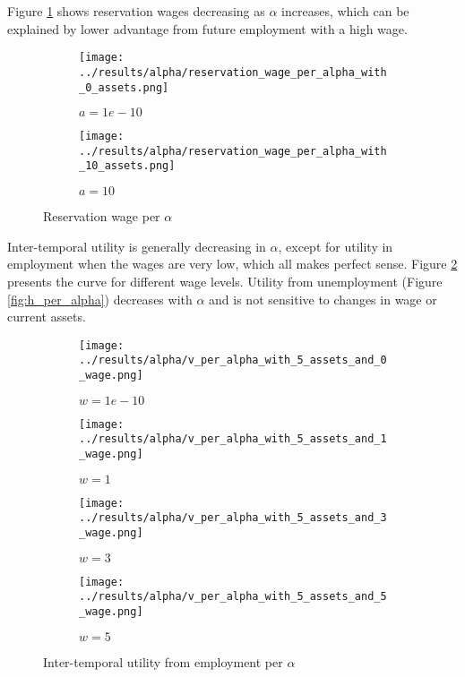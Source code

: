 \documentclass[12pt]{article}
\begin{document}
\vspace{5mm}
Figure \ref{fig:reservation_wage_by_alpha} shows reservation wages decreasing as $\alpha$ increases, which can be explained by lower advantage from future employment with a high wage.

\begin{figure}[hbt!]

\begin{subfigure}{0.5\textwidth}
\texttt{[image: ../results/alpha/reservation\_wage\_per\_alpha\_with\_0\_assets.png]} \caption{$a=1e-10$}
\end{subfigure}%
\begin{subfigure}{0.5\textwidth}
\texttt{[image: ../results/alpha/reservation\_wage\_per\_alpha\_with\_10\_assets.png]}
\caption{$a=10$}
\end{subfigure}

\caption{Reservation wage per $\alpha$}
\label{fig:reservation_wage_by_alpha}
\end{figure}

\vspace{5mm}
Inter-temporal utility is generally decreasing in $\alpha$, except for utility in employment when the wages are very low, which all makes perfect sense. Figure \ref{fig:v_per_alpha} presents the curve for different wage levels. Utility from unemployment (Figure \ref{fig:h_per_alpha}) decreases with $\alpha$ and is not sensitive to changes in wage or current assets.


\begin{figure}[hbt!]

\begin{subfigure}{0.5\textwidth}
\texttt{[image: ../results/alpha/v\_per\_alpha\_with\_5\_assets\_and\_0\_wage.png]} \caption{$w=1e-10$}
\end{subfigure}%
\begin{subfigure}{0.5\textwidth}
\texttt{[image: ../results/alpha/v\_per\_alpha\_with\_5\_assets\_and\_1\_wage.png]}
\caption{$w=1$}
\end{subfigure}

\begin{subfigure}{0.5\textwidth}
\texttt{[image: ../results/alpha/v\_per\_alpha\_with\_5\_assets\_and\_3\_wage.png]} \caption{$w=3$}
\end{subfigure}%
\begin{subfigure}{0.5\textwidth}
\texttt{[image: ../results/alpha/v\_per\_alpha\_with\_5\_assets\_and\_5\_wage.png]}
\caption{$w=5$}
\end{subfigure}

\caption{Inter-temporal utility from employment per $\alpha$}
\label{fig:v_per_alpha}
\end{figure}
\end{document}
